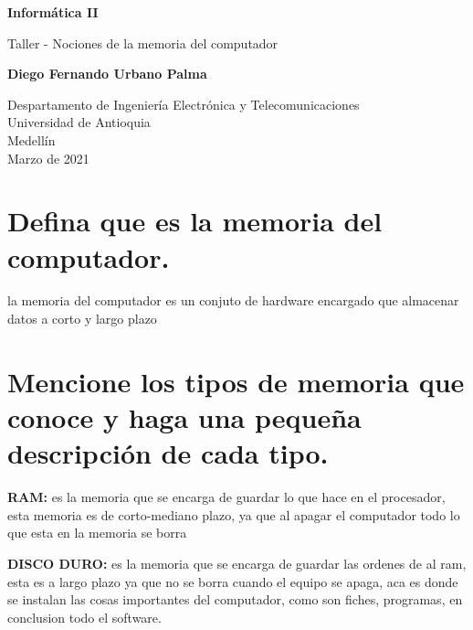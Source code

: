 \documentclass{article}
\begin{document}
\begin{titlepage}
    \begin{center}
        \vspace*{1cm}
            
        \Huge
        \textbf{Informática II}
            
        \vspace{0.5cm}
        \LARGE
        Taller - Nociones de la memoria del computador
            
        \vspace{1.5cm}
            
        \textbf{Diego Fernando Urbano Palma}
            
        \vfill
            
        \vspace{0.8cm}
            
        \Large
        Despartamento de Ingeniería Electrónica y Telecomunicaciones\\
        Universidad de Antioquia\\
        Medellín\\
        Marzo de 2021
            
    \end{center}
\end{titlepage}

\tableofcontents
\newpage
\section{ Defina que es la memoria del computador.}\label{intro}

la memoria del computador es un conjuto de hardware encargado que almacenar datos a corto y largo plazo

\section{Mencione los tipos de memoria que conoce y haga una pequeña descripción de cada tipo.} \label{contenido}

\textbf{RAM:} es la memoria que se encarga de guardar lo que hace en el procesador, esta memoria es de corto-mediano plazo, ya que al apagar el computador todo lo que  esta en la memoria se borra    

\textbf{DISCO DURO: } es la memoria que se encarga de guardar las ordenes de al ram, esta es a largo plazo ya que no se borra cuando el equipo se apaga, aca  es donde se instalan las cosas importantes del computador, como son fiches, programas, en conclusion todo el software. 
\end{document}
